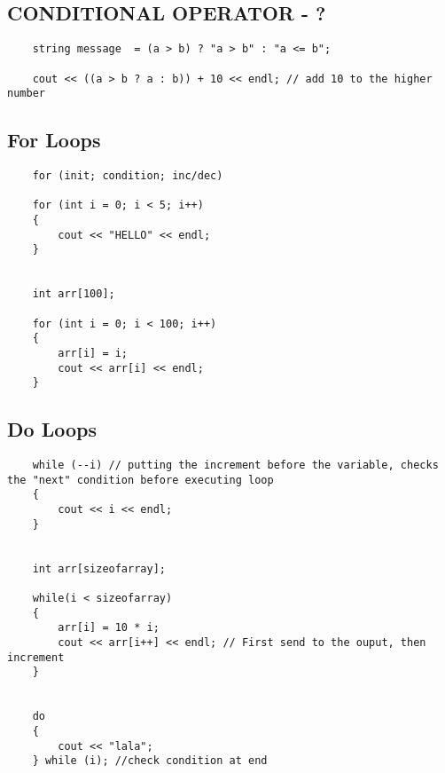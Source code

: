 \documentclass{article}
\begin{document}
\subsection{CONDITIONAL OPERATOR - ?}
\begin{lstlisting}
	string message  = (a > b) ? "a > b" : "a <= b";

	cout << ((a > b ? a : b)) + 10 << endl; // add 10 to the higher number
\end{lstlisting}


\subsection{For Loops}
\begin{lstlisting}
	for (init; condition; inc/dec)
	
	for (int i = 0; i < 5; i++)
	{
		cout << "HELLO" << endl;
	}
	
	
	int arr[100];

	for (int i = 0; i < 100; i++)
	{
		arr[i] = i;
		cout << arr[i] << endl;
	}

\end{lstlisting}

\subsection{Do Loops}
\begin{lstlisting}
	while (--i) // putting the increment before the variable, checks the "next" condition before executing loop
	{
		cout << i << endl;
	}
	
	
	int arr[sizeofarray];
	
	while(i < sizeofarray)
	{
		arr[i] = 10 * i;
		cout << arr[i++] << endl; // First send to the ouput, then increment
	}
	
	
	do
	{
		cout << "lala";
	} while (i); //check condition at end

\end{lstlisting}
\end{document}

